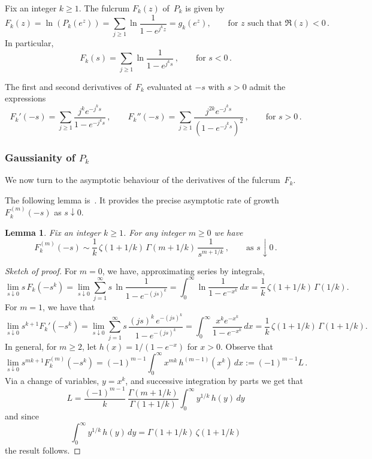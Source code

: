 \documentclass[12pt]{amsart}
\newtheorem{lemmaL}{Lemma}
\theoremstyle{definition}
\begin{document}
Fix an integer $k\ge 1$. The fulcrum $F_k(z)$ of~$P_k$ is given by
\begin{equation}\label{eq:fulcrumPk}
F_k(z) = \ln(P_k(e^z)) = \sum_{j\ge 1} \ln\frac{1}{1-e^{j^k z}} = g_k(e^z), \qquad \text{for } z \text{ such that } \Re(z)<0\,.
\end{equation}
In particular,
\begin{equation}\label{eq:fulcrumPkreal}
F_k(s) = \sum_{j\ge 1} \ln\frac{1}{1-e^{j^k s}}\,, \qquad \text{for } s<0\,.
\end{equation}

The first and second derivatives of~$F_k$ evaluated at $-s$ with $s>0$ admit the expressions
\[
F_k'(-s) = \sum_{j\ge 1} \frac{j^k e^{-j^k s}}{1-e^{-j^k s}}\,, \qquad
F_k''(-s) = \sum_{j\ge 1} \frac{j^{2k} e^{-j^k s}}{(1-e^{-j^k s})^2}\,, \qquad \text{for } s>0\,.
\]


\subsubsection{Gaussianity of $P_k$}\label{subsubsec:GaussianityPk}

We now turn to the asymptotic behaviour of the derivatives
of the fulcrum~$F_k$.
\smallskip

The following lemma is~\cite[Proposition~5.2]{MaciaGaussianity}. It provides the precise asymptotic rate
of growth $F_k^{(m)}(-s)$ as $s\downarrow 0$.

\begin{lemmaL}\label{lem:asympt derivatives Fk}
Fix an integer $k\ge 1$. For any integer $m\ge 0$ we have
\[
F_k^{(m)}(-s) \sim \frac{1}{k}\,\zeta(1+1/k)\,\Gamma(m+1/k)\,\frac{1}{s^{m+1/k}}\,, \qquad \text{as } s\downarrow 0\,.
\]
\end{lemmaL}

\begin{proof}[Sketch of proof]
For $m=0$, we have, approximating series by integrals,
\[
\lim_{s\downarrow 0} s\, F_k(-s^k) = \lim_{s\downarrow 0} \sum_{j=1}^{\infty} s\, \ln\frac{1}{1-e^{-(js)^k}} = \int_0^{\infty} \ln\frac{1}{1-e^{-x^k}}\, dx = \frac{1}{k}\,\zeta(1+1/k)\,\Gamma(1/k).
\]
For $m=1$, we have that
\[
\lim_{s\downarrow 0} s^{k+1} F_k'(-s^k) = \lim_{s\downarrow 0} \sum_{j=1}^{\infty} s\, \frac{(js)^k\, e^{-(js)^k}}{1-e^{-(js)^k}} = \int_0^{\infty} \frac{x^k e^{-x^k}}{1-e^{-x^k}}\, dx = \frac{1}{k}\,\zeta(1+1/k)\,\Gamma(1+1/k).
\]
In general, for $m\ge 2$, let $h(x) = 1/(1-e^{-x})$ for $x>0$. Observe that
\[
\lim_{s\downarrow 0} s^{mk+1} F_k^{(m)}(-s^k) = (-1)^{m-1} \int_0^{\infty} x^{mk}\, h^{(m-1)}(x^k)\, dx := (-1)^{m-1} L\,.
\]
Via a change of variables, $y=x^k$, and successive integration by parts we get that
\[
L = \frac{(-1)^{m-1}}{k}\, \frac{\Gamma(m+1/k)}{\Gamma(1+1/k)} \int_0^{\infty} y^{1/k}\, h(y)\, dy
\]
and since
\[
\int_0^{\infty} y^{1/k}\, h(y)\, dy = \Gamma(1+1/k)\,\zeta(1+1/k)
\]
the result follows.
\end{proof}
\end{document}
